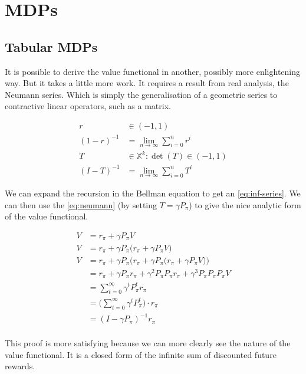 \chapter{MDPs}

\section{Tabular MDPs}\label{vf-neumann}

It is possible to derive the value functional in another, possibly more enlightening way. But it takes a little more work. It requires a result from real analysis, the Neumann series. Which is simply the generalisation of a geometric series to contractive linear operators, such as a matrix.

\begin{align*}
r &\in (-1, 1) \\
(1-r)^{-1} &= \lim_{n\to \infty} \sum_{i=0}^n r^i \tag{Geometric series}\\
T &\in \mathbb X^k: \det(T) \in (-1, 1) \\
(I-T)^{-1} &= \lim_{n\to \infty} \sum_{i=0}^n T^i \label{eq:neumann}\tag{Neumann series}
\end{align*}

We can expand the recursion in the Bellman equation to get an \eqref{eq:inf-series}. We can then use the \eqref{eq:neumann} (by setting $T=\gamma P_{\pi}$) to give the nice analytic form of the value functional.

\begin{align*}
V &= r_{\pi} + \gamma P_{\pi} V \tag{Bellman eqn}\\
V &= r_{\pi} + \gamma P_{\pi}\big( r_{\pi} + \gamma P_{\pi} V\big) \\
V &= r_{\pi} + \gamma P_{\pi}\Big(r_{\pi} + \gamma P_{\pi}\big( r_{\pi} + \gamma P_{\pi} V\big)) \\
&= r_{\pi} + \gamma P_{\pi}r_\pi + \gamma^2 P_{\pi}P_{\pi}r_{\pi} + \gamma^3 P_{\pi}P_{\pi}P_{\pi}V \\
&= \sum_{t=0}^{\infty} \gamma^tP_{\pi}^tr_{\pi} \label{eq:inf-series}\tag{infinite series} \\
&= \big( \sum_{t=0}^{\infty} \gamma^tP_{\pi}^t \big) \cdot r_{\pi}\\
&= (I-\gamma P_{\pi})^{-1} r_{\pi} \tag{value functional}\\
\end{align*}

This proof is more satisfying because we can more clearly see the nature of the value functional. It is a closed form of the infinite sum of discounted future rewards.


